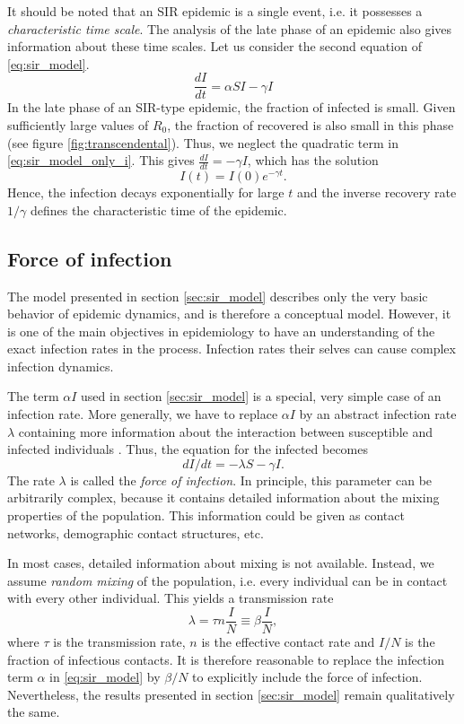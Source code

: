 \documentclass[openright,twoside,headsepline]{scrbook}
\begin{document}
It should be noted that an SIR epidemic is a single event, i.e. it possesses a \emph{characteristic time scale}.
The analysis of the late phase of an epidemic also gives information about these time scales.
Let us consider the second equation of \eqref{eq:sir_model}.
\begin{equation}\label{eq:sir_model_only_i}
\frac{dI}{dt} = \alpha SI -\gamma I
\end{equation}
In the late phase of an SIR-type epidemic, the fraction of infected is small.
Given sufficiently large values of $R_0$, the fraction of recovered is also small in this phase (see figure \ref{fig:transcendental}).
Thus, we neglect the quadratic term in \eqref{eq:sir_model_only_i}.
This gives $\frac{dI}{dt} = -\gamma I $, which has the solution
$$
I(t)=I(0)e^{-\gamma t}.
$$
Hence, the infection decays exponentially for large $t$ and the inverse recovery rate $1/\gamma $ defines the characteristic time of the epidemic.

\subsection{Force of infection}
The model presented in section \ref{sec:sir_model} describes only the very basic behavior of epidemic dynamics, and is therefore a conceptual model.
However, it is one of the main objectives in epidemiology to have an understanding of the exact infection rates in the process.
Infection rates their selves can cause complex infection dynamics.

The term $\alpha I$ used in section \ref{sec:sir_model} is a special, very simple case of an infection rate.
More generally, we have to replace $\alpha I$ by an abstract infection rate $\lambda $ containing more information about the interaction between susceptible and infected individuals \cite{Keeling:2005}.
Thus, the equation for the infected becomes
$$
dI/dt = -\lambda S -\gamma I.
$$
The rate $\lambda $ is called the \emph{force of infection}.
In principle, this parameter can be arbitrarily complex, because it contains detailed information about the mixing properties of the population.
This information could be given as contact networks, demographic contact structures, etc.

In most cases, detailed information about mixing is not available.
Instead, we assume \emph{random mixing} of the population, i.e. every individual can be in contact with every other individual.
This yields a transmission rate \cite{Keeling:2005}
\begin{equation}\label{eq:force_of_infection}
\lambda = \tau n \frac{I}{N}\equiv \beta \frac{I}{N},
\end{equation}
where $\tau $ is the transmission rate, $n$ is the effective contact rate and $I/N$ is the fraction of infectious contacts.
It is therefore reasonable to replace the infection term $\alpha $ in \eqref{eq:sir_model} by $\beta /N$ to explicitly include the force of infection.
Nevertheless, the results presented in section \ref{sec:sir_model} remain qualitatively the same.
\end{document}
